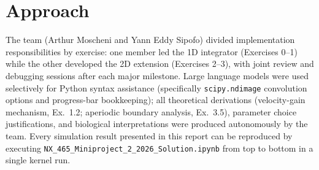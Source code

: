 \documentclass[11pt, a4paper]{article}
\begin{document}
\section{Approach}

The team (Arthur Moscheni and Yann Eddy Sipofo) divided implementation responsibilities by
exercise: one member led the 1D integrator (Exercises 0--1) while the other developed the 2D
extension (Exercises 2--3), with joint review and debugging sessions after each major milestone.
Large language models were used selectively for Python syntax assistance (specifically
\texttt{scipy.ndimage} convolution options and progress-bar bookkeeping); all theoretical
derivations (velocity-gain mechanism, Ex.~1.2; aperiodic boundary analysis, Ex.~3.5),
parameter choice justifications, and biological interpretations were produced autonomously
by the team. Every simulation result presented in this report can be reproduced by executing
\texttt{NX\_465\_Miniproject\_2\_2026\_Solution.ipynb} from top to bottom in a single kernel run.



\end{document}
